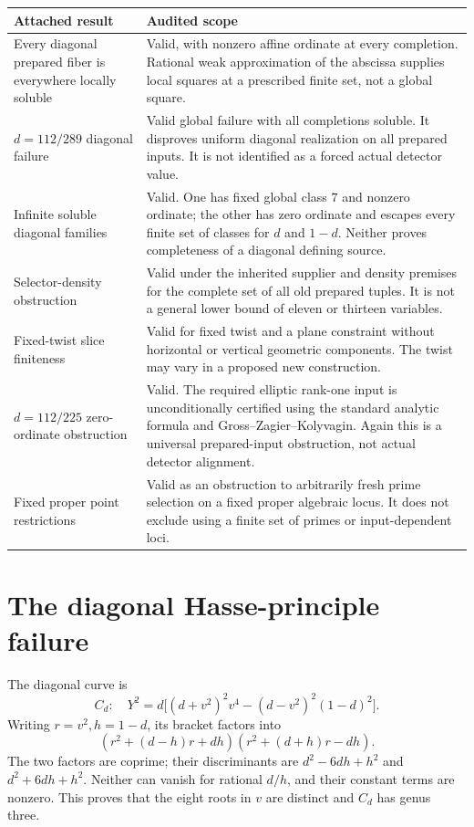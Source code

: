 \documentclass[11pt,a4paper]{article}
\begin{document}
\begin{center}\small
\begin{tabular}{p{.28\linewidth}p{.65\linewidth}}
\toprule
Attached result & Audited scope\\\midrule
Every diagonal prepared fiber is everywhere locally soluble &
Valid, with nonzero affine ordinate at every completion. Rational weak
approximation of the abscissa supplies local squares at a prescribed finite
set, not a global square.\\[3pt]
$d=112/289$ diagonal failure &
Valid global failure with all completions soluble. It disproves uniform
diagonal realization on all prepared inputs. It is not identified as a
forced actual detector value.\\[3pt]
Infinite soluble diagonal families &
Valid. One has fixed global class $7$ and nonzero ordinate; the other has
zero ordinate and escapes every finite set of classes for $d$ and $1-d$.
Neither proves completeness of a diagonal defining source.\\[3pt]
Selector-density obstruction &
Valid under the inherited supplier and density premises for the complete
set of all old prepared tuples. It is not a general lower bound of eleven
or thirteen variables.\\[3pt]
Fixed-twist slice finiteness &
Valid for fixed twist and a plane constraint without horizontal or vertical
geometric components. The twist may vary in a proposed new construction.\\[3pt]
$d=112/225$ zero-ordinate obstruction &
Valid. The required elliptic rank-one input is unconditionally certified
using the standard analytic formula and Gross--Zagier--Kolyvagin. Again this
is a universal prepared-input obstruction, not actual detector alignment.\\[3pt]
Fixed proper point restrictions &
Valid as an obstruction to arbitrarily fresh prime selection on a fixed
proper algebraic locus. It does not exclude using a finite set of primes
or input-dependent loci.\\\bottomrule
\end{tabular}
\end{center}

\section{The diagonal Hasse-principle failure}
The diagonal curve is
\[
 C_d:\quad Y^2=d\big[(d+v^2)^2v^4-(d-v^2)^2(1-d)^2\big].
\]
Writing $r=v^2,h=1-d$, its bracket factors into
\[
 (r^2+(d-h)r+dh)(r^2+(d+h)r-dh).
\]
The two factors are coprime; their discriminants are
$d^2-6dh+h^2$ and $d^2+6dh+h^2$. Neither can vanish for rational
$d/h$, and their constant terms are nonzero. This proves that the eight
roots in $v$ are distinct and $C_d$ has genus three.
\end{document}
